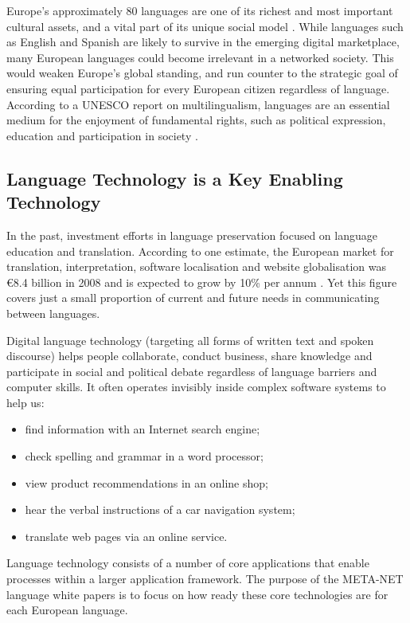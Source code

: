\documentclass[]{../../metanetpaper}
\begin{document}
\begin{multicols}{2}
    Europe’s approximately 80 languages are one of its richest and most important cultural assets, and a vital part of its unique social model \cite{CAT-Nota2}. While languages such as English and Spanish are likely to survive in the emerging digital marketplace, many European languages could become irrelevant in a networked society. This would weaken Europe’s global standing, and run counter to the strategic goal of ensuring equal participation for every European citizen regardless of language. According to a UNESCO report on multilingualism, languages are an essential medium for the enjoyment of fundamental rights, such as political expression, education and participation in society \cite{CAT-Nota3}.

\subsection{Language Technology is a Key Enabling Technology}

    In the past, investment efforts in language preservation focused on language education and translation. According to one estimate, the European market for translation, interpretation, software localisation and website globalisation was €8.4 billion in 2008 and is expected to grow by 10\% per annum \cite{CAT-Nota4}. Yet this figure covers just a small proportion of current and future needs in communicating between languages. 

    Digital language technology (targeting all forms of written text and spoken discourse) helps people collaborate, conduct business, share knowledge and participate in social and political debate regardless of language barriers and computer skills. It often operates invisibly inside complex software systems to help us:
    \begin{itemize}
      \item find information with an Internet search engine;
      \item check spelling and grammar in a word processor;
      \item view product recommendations in an online shop;
      \item hear the verbal instructions of a car navigation system;
      \item translate web pages via an online service.
    \end{itemize}
    Language technology consists of a number of core applications that enable processes within a larger application framework. The purpose of the META-NET language white papers is to focus on how ready these core technologies are for each European language. 


\end{multicols}
\end{document}

